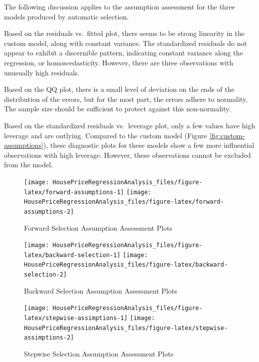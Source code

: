 \documentclass[american,]{article}
\begin{document}
\label{appendix:assessmentPlots}

The following discussion applies to the assumption assessment for the
three models produced by automatic selection.

Based on the residuals vs.~fitted plot, there seems to be strong
linearity in the custom model, along with constant variance. The
standardized residuals do not appear to exhibit a discernible pattern,
indicating constant variance along the regression, or homoscedasticity.
However, there are three observations with unusually high residuals.

Based on the QQ plot, there is a small level of deviation on the ends of
the distribution of the errors, but for the most part, the errors adhere
to normality. The sample size should be sufficient to protect against
this non-normality.

Based on the standardized residuals vs.~leverage plot, only a few values
have high leverage and are outlying. Compared to the custom model
(Figure \ref{fig:custom-assumptions}), these diagnostic plots for these
models show a few more influential observations with high leverage.
However, these observations cannot be excluded from the model.

\begin{figure}[htbp]

{\centering \texttt{[image: HousePriceRegressionAnalysis\_files/figure-latex/forward-assumptions-1]} \texttt{[image: HousePriceRegressionAnalysis\_files/figure-latex/forward-assumptions-2]} 

}

\caption{Forward Selection Assumption Assessment Plots}\label{fig:forward-assumptions}
\end{figure}

\begin{figure}[htbp]

{\centering \texttt{[image: HousePriceRegressionAnalysis\_files/figure-latex/backward-selection-1]} \texttt{[image: HousePriceRegressionAnalysis\_files/figure-latex/backward-selection-2]} 

}

\caption{Backward Selection Assumption Assessment Plots}\label{fig:backward-selection}
\end{figure}

\begin{figure}[htbp]

{\centering \texttt{[image: HousePriceRegressionAnalysis\_files/figure-latex/stepwise-assimptions-1]} \texttt{[image: HousePriceRegressionAnalysis\_files/figure-latex/stepwise-assimptions-2]} 

}

\caption{Stepwise Selection Assumption Assessment Plots}\label{fig:stepwise-assimptions}
\end{figure}
\end{document}
